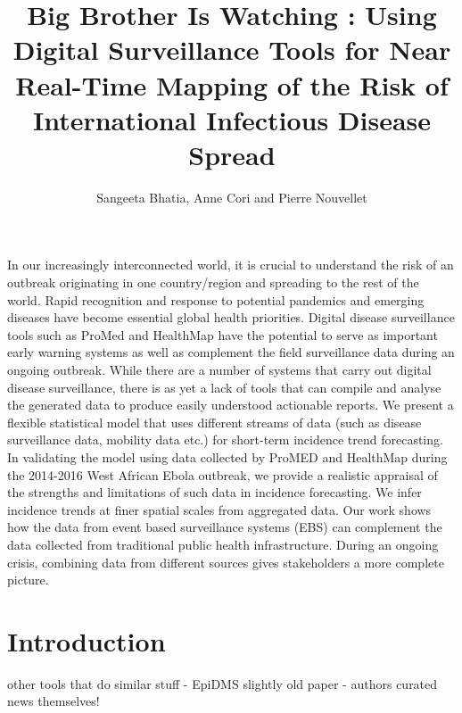 \documentclass[bgd, online, hvmath]{style/copernicus}
\begin{document}
\sloppy

\title{Big Brother Is Watching : Using Digital Surveillance Tools for Near
Real-Time Mapping of the Risk of International Infectious Disease Spread}

\author{Sangeeta Bhatia, Anne Cori and Pierre Nouvellet}






\maketitle


In our increasingly interconnected world, it is crucial to understand
the risk of an outbreak originating in one country/region and spreading
to the rest of the world. Rapid recognition and response to potential
pandemics and emerging diseases have become essential global health
priorities. Digital disease surveillance tools such as ProMed and
HealthMap have the potential to serve as important early warning systems
as well as complement the field surveillance data during an ongoing
outbreak. While there are a number of systems that carry out digital
disease surveillance, there is as yet a lack of tools that can compile
and analyse the generated data to produce easily understood actionable
reports. We present a flexible statistical model that uses different
streams of data (such as disease surveillance data, mobility data etc.)
for short-term incidence trend forecasting.\\
In validating the model using data collected by ProMED and HealthMap
during the 2014-2016 West African Ebola outbreak, we provide a realistic
appraisal of the strengths and limitations of such data in incidence
forecasting. We infer incidence trends at finer spatial scales from
aggregated data. Our work shows how the data from event based
surveillance systems (EBS) can complement the data collected from
traditional public health infrastructure. During an ongoing crisis,
combining data from different sources gives stakeholders a more complete
picture.

\section{Introduction}\label{introduction}

other tools that do similar stuff - EpiDMS \citep{liu2016epidms}
slightly old paper - authors curated news themselves!
\citep{chowell2016elucidating}



\end{document}
